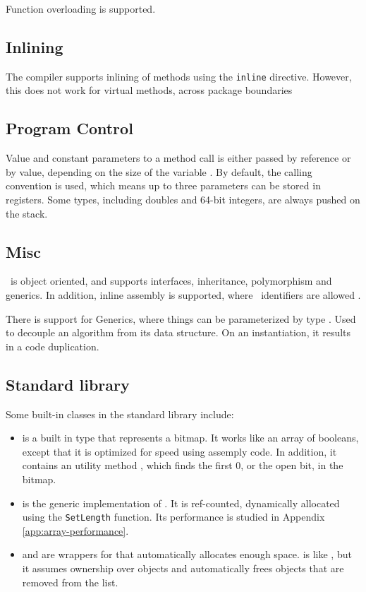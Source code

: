 Function overloading is supported.

\subsection{Inlining}
\label{sub:Inlining}
The compiler supports inlining of methods using the \texttt{inline} directive. However, this does not work for virtual methods, across package boundaries \cite{noauthor_undated-rx} 

\subsection{Program Control}
\label{sub:Program Control}
Value and constant parameters to a method call is either passed by reference or by value, depending on the size of the variable \cite{noauthor_undated-ae}. By default, the  calling convention is used, which means up to three parameters can be stored in registers. Some types, including doubles and 64-bit integers, are always pushed on the stack.

\subsection{Misc}
\label{sec:Misc}
\delphi~is object oriented, and supports interfaces, inheritance, polymorphism and generics. In addition, inline assembly is supported, where \delphi~identifiers are allowed \cite{noauthor_undated-px}.

There is support for Generics, where things can be parameterized by type \cite{noauthor_undated-sx}. Used to decouple an algorithm from its data structure. On an instantiation, it results in a code duplication.

\subsection{Standard library}
\label{sub:Standard library}
Some built-in classes in the standard library include:
\begin{itemize}
    \item {} is a built in type that represents a bitmap. It works like an array of booleans, except that it is optimized for speed using assemply code. In addition, it contains an utility method , which finds the first 0, or the open bit, in the bitmap.
    \item {} is the generic implementation of . It is ref-counted, dynamically allocated using the \texttt{SetLength} function. Its performance is studied in Appendix \ref{app:array-performance}.
    \item {} and  are wrappers for  that automatically allocates enough space.  is like , but it assumes ownership over objects and automatically frees objects that are removed from the list.
\end{itemize}

